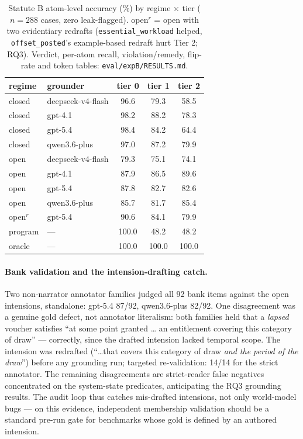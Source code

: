\begin{table}[h]
\centering
\small
\begin{tabular}{llccc}
\toprule
regime & grounder & tier 0 & tier 1 & tier 2 \\
\midrule
closed & deepseek-v4-flash & 96.6 & 79.3 & 58.5 \\
closed & gpt-4.1           & 98.2 & 88.2 & 78.3 \\
closed & gpt-5.4           & 98.4 & 84.2 & 64.4 \\
closed & qwen3.6-plus      & 97.0 & 87.2 & 79.9 \\
open   & deepseek-v4-flash & 79.3 & 75.1 & 74.1 \\
open   & gpt-4.1           & 87.9 & 86.5 & 89.6 \\
open   & gpt-5.4           & 87.8 & 82.7 & 82.6 \\
open   & qwen3.6-plus      & 85.7 & 81.7 & 85.4 \\
open$^{r}$ & gpt-5.4       & 90.6 & 84.1 & 79.9 \\
\midrule
program & ---              & 100.0 & 48.2 & 48.2 \\
oracle  & ---              & 100.0 & 100.0 & 100.0 \\
\bottomrule
\end{tabular}
\caption{Statute B atom-level accuracy (\%) by regime $\times$ tier ($n=288$
cases, zero leak-flagged). open$^{r}$ = open with two evidentiary redrafts
(\texttt{essential\_workload} helped, \texttt{offset\_posted}'s
example-based redraft hurt Tier 2; RQ3). Verdict, per-atom recall,
violation/remedy, flip-rate and token tables:
\texttt{eval/expB/RESULTS.md}.}
\label{tab:expb}
\end{table}

\paragraph{Bank validation and the intension-drafting catch.} Two
non-narrator annotator families judged all 92 bank items against the open
intensions, standalone: gpt-5.4 87/92, qwen3.6-plus 82/92. One disagreement
was a genuine gold defect, not annotator literalism: both families held that
a \emph{lapsed} voucher satisfies ``at some point granted \dots{} an
entitlement covering this category of draw'' --- correctly, since the
drafted intension lacked temporal scope. The intension was redrafted
(``\dots{}that covers this category of draw \emph{and the period of the
draw}'') before any grounding run; targeted re-validation: 14/14 for the
strict annotator. The remaining disagreements are strict-reader false
negatives concentrated on the system-state predicates, anticipating the RQ3
grounding results. The audit loop thus catches mis-drafted intensions, not
only world-model bugs --- on this evidence, independent membership
validation should be a standard pre-run gate for benchmarks whose gold is
defined by an authored intension.

